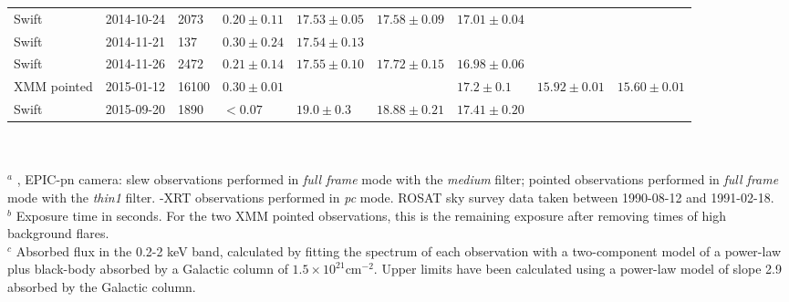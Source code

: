 \begin{table*}[ht]
{\begin{tabular}{l c l l l l l l l}
Swift  & 2014-10-24       &  2073  & $0.20\pm{0.11}$ & $17.53\pm0.05$& $17.58\pm0.09$&  $17.01\pm0.04$& & \\
Swift  & 2014-11-21       &  137  & $0.30\pm{0.24}$ & $17.54\pm0.13$& & & & \\
Swift  & 2014-11-26       &  2472  & $0.21\pm{0.14}$ & $17.55\pm0.10$ & $17.72\pm0.15$&  $16.98\pm0.06$& & \\
XMM pointed & 2015-01-12  &  16100 & $0.30\pm{0.01}$ & & & $17.2\pm0.1$ & $15.92\pm0.01$& $15.60\pm0.01$ \\
Swift  & 2015-09-20       &  1890  & $<0.07$ & $19.0\pm0.3$ & $18.88\pm0.21$ &  $17.41\pm0.20$& & \\
\hline                        %
\end{tabular}}
\hfill{}
\\
\\
$^{a}$ \xmmns, EPIC-pn camera: slew observations performed in {\em full frame}
mode with
the {\em medium} filter; pointed observations performed in {\em full frame} mode with
the {\em thin1} filter. \swiftns-XRT observations performed in {\em pc} mode. 
ROSAT sky survey data taken between 1990-08-12 and 1991-02-18.\\
$^{b}$ Exposure time in seconds. For the two XMM pointed observations, this is the
remaining exposure after removing times of high background flares. \\
$^{c}$ Absorbed flux in the 0.2-2 keV band, calculated by
fitting the spectrum of each observation with a two-component model of 
a power-law plus black-body
absorbed by a Galactic column of $1.5\times10^{21}$cm$^{-2}$. Upper limits
have been calculated using a power-law model of slope 2.9 absorbed by the
Galactic column.\\
\end{table*}
